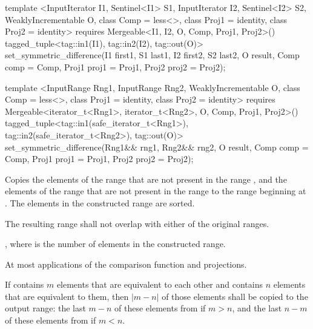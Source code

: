 %
\begin{itemdecl}
template <InputIterator I1, Sentinel<I1> S1, InputIterator I2, Sentinel<I2> S2,
    WeaklyIncrementable O, class Comp = less<>, class Proj1 = identity, class Proj2 = identity>
  requires Mergeable<I1, I2, O, Comp, Proj1, Proj2>()
  tagged_tuple<tag::in1(I1), tag::in2(I2), tag::out(O)>
    set_symmetric_difference(I1 first1, S1 last1, I2 first2, S2 last2, O result,
                             Comp comp = Comp{}, Proj1 proj1 = Proj1{},
                             Proj2 proj2 = Proj2{});

template <InputRange Rng1, InputRange Rng2, WeaklyIncrementable O,
    class Comp = less<>, class Proj1 = identity, class Proj2 = identity>
  requires Mergeable<iterator_t<Rng1>, iterator_t<Rng2>, O, Comp, Proj1, Proj2>()
  tagged_tuple<tag::in1(safe_iterator_t<Rng1>),
               tag::in2(safe_iterator_t<Rng2>),
               tag::out(O)>
    set_symmetric_difference(Rng1&& rng1, Rng2&& rng2, O result, Comp comp = Comp{},
                             Proj1 proj1 = Proj1{}, Proj2 proj2 = Proj2{});
\end{itemdecl}

\begin{itemdescr}
\pnum
\effects
Copies the elements of the range
that are not present in the range
,
and the elements of the range
that are not present in the range
to the range beginning at
.
The elements in the constructed range are sorted.

\pnum
\requires
The resulting range shall not overlap with either of the original ranges.

\pnum
\returns
{}, where  is
the number of elements in the constructed range.

\pnum
\complexity
At most
applications of the comparison function and projections.

\pnum
\notes
If  contains $m$ elements that are equivalent to each other and
 contains $n$ elements that are equivalent to them, then
$|m - n|$ of those elements shall be copied to the output range: the last
$m - n$ of these elements from  if $m > n$, and the last
$n - m$ of these elements from  if $m < n$.
\end{itemdescr}

